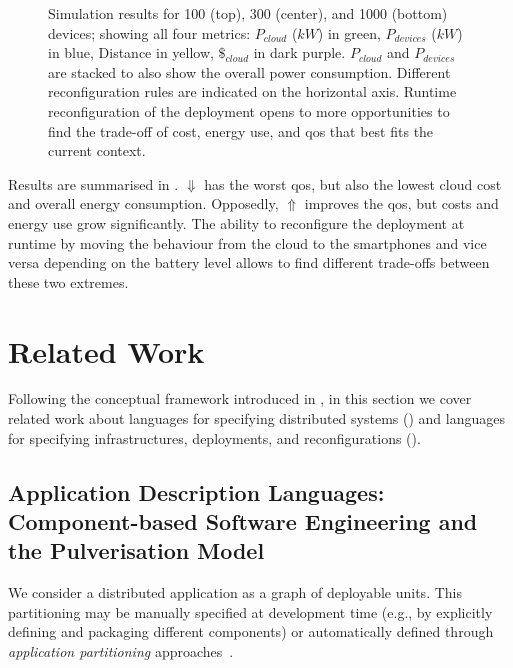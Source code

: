 \documentclass[conference]{IEEEtran}
\begin{document}
\begin{figure}
    \caption{
        Simulation results for 100 (top), 300 (center), and 1000 (bottom) devices;
        showing all four metrics:
        $P_{cloud}$ ($kW$) in green,
        $P_{devices}$ ($kW$) in blue,
        Distance in yellow, $\$_{cloud}$ in dark purple.
        $P_{cloud}$ and $P_{devices}$ are stacked to also show the overall power consumption.
        Different reconfiguration rules are indicated on the horizontal axis.
        Runtime reconfiguration of the deployment opens to more opportunities to find the trade-off of cost,
        energy use, and \ac{qos} that best fits the current context.
    }
    \label{fig:results}
\end{figure}
%
Results are summarised in .
%
$\Downarrow$ has the worst \ac{qos}, but also the lowest cloud cost and overall energy consumption.
%
Opposedly, $\Uparrow$ improves the \ac{qos}, but costs and energy use grow significantly.
%
The ability to reconfigure the deployment at runtime
by moving the behaviour from the cloud to the smartphones and vice versa
depending on the battery level allows to find different trade-offs between these two extremes.

\section{Related Work}
\label{sec:rw}

%
Following the conceptual framework introduced in ,
 in this section we cover related work about
 languages for 
 specifying distributed systems ()
 and
 languages for specifying infrastructures, deployments, and reconfigurations (). 
 
 
 
\subsection{Application Description Languages: Component-based Software Engineering and the Pulverisation Model}
\label{sec:rw:whatsw}
%
%
We consider a distributed application 
 as a graph of deployable units.
%
This partitioning may be 
 manually specified at development time
 (e.g., by explicitly defining and packaging different components)
 or automatically defined
 through \emph{application partitioning} approaches~\cite{DBLP:journals/jnca/LiuASGBQ15}. %
 
\end{document}
